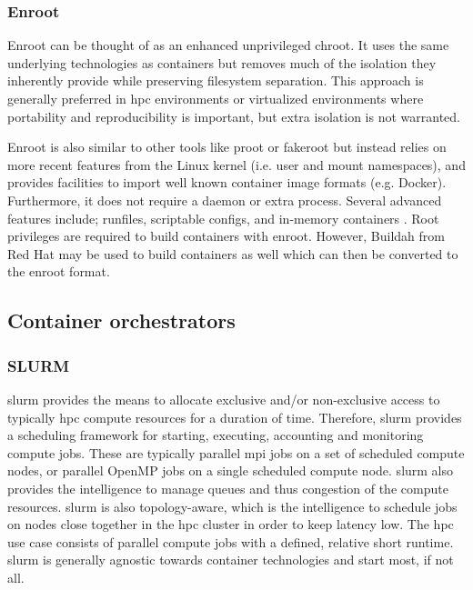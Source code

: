 \documentclass[conference]{IEEEtran}
\begin{document}
\subsubsection{Enroot}
Enroot can be thought of as an enhanced unprivileged chroot. It uses the same underlying technologies as containers but removes much of the isolation they inherently provide while preserving filesystem separation. This approach is generally preferred in \gls{hpc} environments or virtualized environments where portability and reproducibility is important, but extra isolation is not warranted.

Enroot is also similar to other tools like proot or fakeroot but instead relies on more recent features from the Linux kernel (i.e. user and mount namespaces), and provides facilities to import well known container image formats (e.g. Docker). Furthermore, it does not require a daemon or extra process. Several advanced features include; runfiles, scriptable configs, and in-memory containers \cite{nvidia-slurm-containers}. Root privileges are required to build containers with enroot. However, Buildah from Red Hat may be used to build containers as well which can then be converted to the enroot format.


\subsection{Container orchestrators}
\subsubsection{SLURM}
\gls{slurm} provides the means to allocate exclusive and/or non-exclusive access to typically \gls{hpc} compute resources for a duration of time. Therefore, \gls{slurm} provides a scheduling framework for starting, executing, accounting and monitoring compute jobs. These are typically parallel \gls{mpi} jobs on a set of scheduled compute nodes, or parallel OpenMP jobs on a single scheduled compute node. \gls{slurm} also provides the intelligence to manage queues and thus congestion of the compute resources. \gls{slurm} is also topology-aware, which is the intelligence to schedule jobs on nodes close together in the \gls{hpc} cluster in order to keep latency low. The \gls{hpc} use case consists of parallel compute jobs with a defined, relative short runtime. \gls{slurm} is generally agnostic towards container technologies and start most, if not all.
\end{document}
